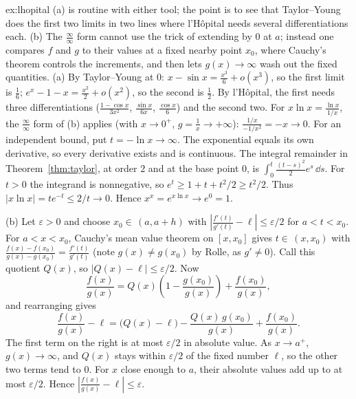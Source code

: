 \begin{solution}{ex:lhopital}
\idea (a) is routine with either tool; the point is to see that Taylor--Young does the first two limits in two lines where l'H\^opital needs several differentiations each. (b) The $\frac\infty\infty$ form cannot use the trick of extending by $0$ at $a$; instead one compares $f$ and $g$ to their values at a fixed nearby point $x_0$, where Cauchy's theorem controls the increments, and then lets $g(x)\to\infty$ wash out the fixed quantities.
\writeup (a) By Taylor--Young at $0$: $x-\sin x=\frac{x^3}6+o(x^3)$, so the first limit is $\frac16$; $e^x-1-x=\frac{x^2}2+o(x^2)$, so the second is $\frac12$. By l'H\^opital, the first needs three differentiations ($\frac{1-\cos x}{3x^2}$, $\frac{\sin x}{6x}$, $\frac{\cos x}6$) and the second two. For $x\ln x=\frac{\ln x}{1/x}$, the $\frac\infty\infty$ form of (b) applies (with $x\to0^+$, $g=\frac1x\to+\infty$): $\frac{1/x}{-1/x^2}=-x\to0$. For an independent bound, put $t=-\ln x\to\infty$. The exponential equals its own derivative, so every derivative exists and is continuous. The integral remainder in Theorem~\ref{thm:taylor}, at order $2$ and at the base point $0$, is $\int_0^t\frac{(t-s)^2}{2}e^s\,\dd s$. For $t>0$ the integrand is nonnegative, so $e^t\ge1+t+t^2/2\ge t^2/2$. Thus $|x\ln x|=te^{-t}\le2/t\to0$.
Hence $x^x=e^{x\ln x}\to e^0=1$.

(b) Let $\varepsilon>0$ and choose $x_0\in\,(a,a+h)$ with $\left|\frac{f'(t)}{g'(t)}-\ell\right|\le\varepsilon/2$ for $a<t<x_0$. For $a<x<x_0$, Cauchy's mean value theorem on $[x,x_0]$ gives $t\in\,(x,x_0)$ with $\frac{f(x)-f(x_0)}{g(x)-g(x_0)}=\frac{f'(t)}{g'(t)}$ (note $g(x)\ne g(x_0)$ by Rolle, as $g'\ne0$). Call this quotient $Q(x)$, so $\left|Q(x)-\ell\right|\le\varepsilon/2$. Now
\[
\frac{f(x)}{g(x)}=Q(x)\left(1-\frac{g(x_0)}{g(x)}\right)+\frac{f(x_0)}{g(x)},
\]
and rearranging gives
\[
\frac{f(x)}{g(x)}-\ell=\bigl(Q(x)-\ell\bigr)-\frac{Q(x)\,g(x_0)}{g(x)}+\frac{f(x_0)}{g(x)}.
\]
The first term on the right is at most $\varepsilon/2$ in absolute value. As $x\to a^+$, $g(x)\to\infty$, and $Q(x)$ stays within $\varepsilon/2$ of the fixed number $\ell$, so the other two terms tend to $0$. For $x$ close enough to $a$, their absolute values add up to at most $\varepsilon/2$. Hence $\left|\frac{f(x)}{g(x)}-\ell\right|\le\varepsilon$.
\end{solution}

